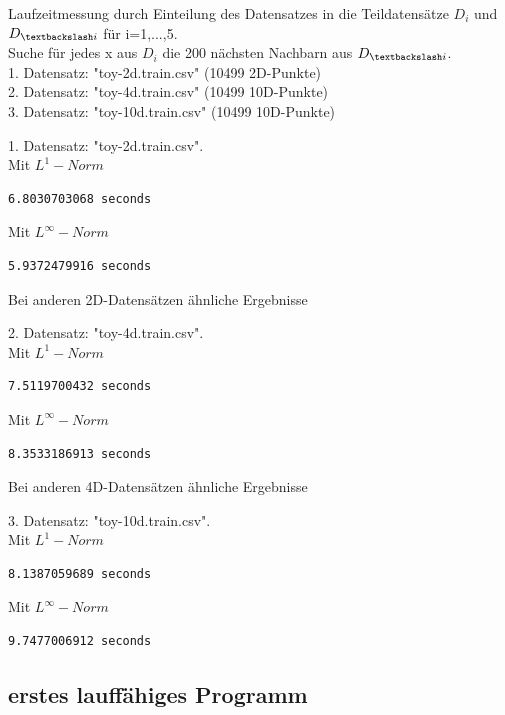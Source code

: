 \documentclass{beamer}
\begin{document}
\begin{frame}
Laufzeitmessung durch Einteilung des Datensatzes in die Teildatensätze $D_i$ und  $D_{\textbackslash i}$ für i=1,...,5.\\
Suche für jedes x aus $D_i$ die 200 nächsten Nachbarn aus $D_{\textbackslash i}$.\\
1. Datensatz: "toy-2d.train.csv" (10499 2D-Punkte)\\
2. Datensatz: "toy-4d.train.csv" (10499 10D-Punkte)\\
3. Datensatz: "toy-10d.train.csv" (10499 10D-Punkte)
\end{frame}


\begin{frame}[fragile]
1. Datensatz: "toy-2d.train.csv".\\
\vspace{5mm}
Mit $L^1-Norm$
\begin{verbatim}
6.8030703068 seconds
\end{verbatim}
Mit $L^{\infty}-Norm$
\begin{verbatim}
5.9372479916 seconds
\end{verbatim}
Bei anderen 2D-Datensätzen ähnliche Ergebnisse
\end{frame}


\begin{frame}[fragile]
2. Datensatz: "toy-4d.train.csv".\\
\vspace{5mm}
Mit $L^1-Norm$
\begin{verbatim}
7.5119700432 seconds
\end{verbatim}
Mit $L^{\infty}-Norm$
\begin{verbatim}
8.3533186913 seconds
\end{verbatim}
Bei anderen 4D-Datensätzen ähnliche Ergebnisse
\end{frame}

\begin{frame}[fragile]
3. Datensatz: "toy-10d.train.csv".\\
\vspace{5mm}
Mit $L^1-Norm$
\begin{verbatim}
8.1387059689 seconds
\end{verbatim}
Mit $L^{\infty}-Norm$
\begin{verbatim}
9.7477006912 seconds
\end{verbatim}
\end{frame}
\subsection{erstes lauffähiges Programm}
\end{document}
